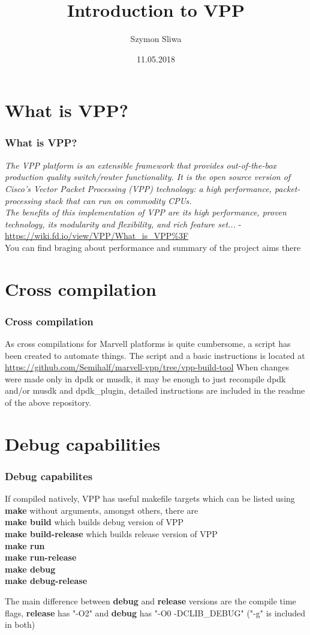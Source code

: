 \documentclass{beamer}
\title{Introduction to VPP}
\author{Szymon Sliwa}
\date{11.05.2018}
\begin{document}
\frame{\titlepage}

  \begin{frame}
  \tableofcontents
  \end{frame}

\section{What is VPP?}
  \begin{frame}
  \frametitle{What is VPP?}
  \textit{The VPP platform is an extensible framework that provides out-of-the-box production quality switch/router functionality. It is the open source version of Cisco's Vector Packet Processing (VPP) technology: a high performance, packet-processing stack that can run on commodity CPUs. \\
The benefits of this implementation of VPP are its high performance, proven technology, its modularity and flexibility, and rich feature set...} - \url{https://wiki.fd.io/view/VPP/What_is_VPP\%3F} \\
  \vfill
You can find braging about performance and summary of the project aims there

  \end{frame}

\section{Cross compilation}
  \begin{frame}
  \frametitle{Cross compilation}
  As cross compilations for Marvell platforms is quite cumbersome, a script has been 
  created to automate things. The script and a basic instructions is located at
  {\tiny\url{https://github.com/Semihalf/marvell-vpp/tree/vpp-build-tool}}
  \vfill
    When changes were made only in dpdk or musdk, it may be enough to just
  recompile dpdk and/or musdk and dpdk\_plugin, detailed instructions are included in the readme
  of the above repository.
  \end{frame}

\section{Debug capabilities}
  \begin{frame}
  \frametitle{Debug capabilites}
  If compiled natively, VPP has useful makefile targets which can be listed using
  \textbf{make} without arguments, amongst others, there are \\
  \textbf{make build} which builds debug version of VPP \\
  \textbf{make build-release} which builds release version of VPP \\
  \textbf{make run} \\
  \textbf{make run-release} \\
  \textbf{make debug} \\
  \textbf{make debug-release}

  The main difference between \textbf{debug} and \textbf{release} versions
  are the compile time flags, \textbf{release} has "-O2" and
  \textbf{debug} has "-O0 -DCLIB\_DEBUG" \tiny{("-g" is included in both)}
  \end{frame}
  
\end{document}
